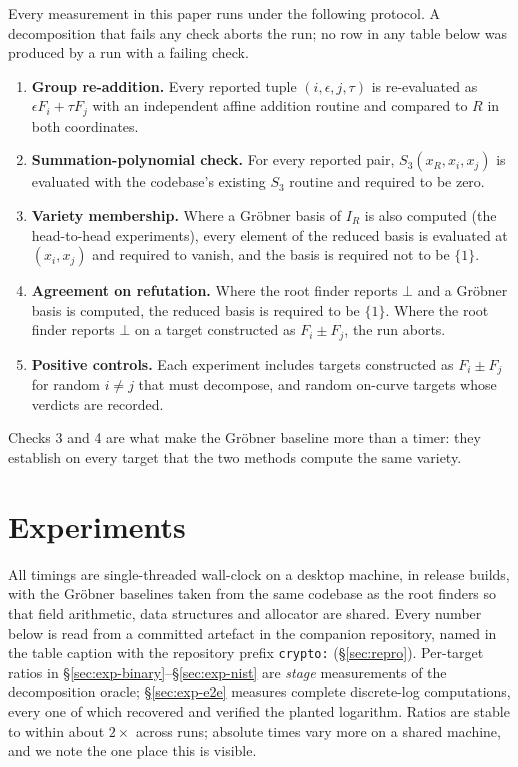 \documentclass[10pt,a4paper]{article}
\theoremstyle{remark}
\newcommand{\Sem}[1]{S_{#1}}
\newcommand{\code}[1]{\texttt{#1}}
\begin{document}
Every measurement in this paper runs under the following protocol. A
decomposition that fails any check aborts the run; no row in any table
below was produced by a run with a failing check.

\begin{enumerate}
\item \textbf{Group re-addition.} Every reported tuple
  $(i, \epsilon, j, \tau)$ is re-evaluated as $\epsilon F_i + \tau F_j$
  with an independent affine addition routine and compared to $R$ in
  both coordinates.
\item \textbf{Summation-polynomial check.} For every reported pair,
  $\Sem{3}(x_R, x_i, x_j)$ is evaluated with the codebase's existing
  $\Sem{3}$ routine and required to be zero.
\item \textbf{Variety membership.} Where a Gr\"obner basis of $I_R$ is
  also computed (the head-to-head experiments), every element of the
  reduced basis is evaluated at $(x_i, x_j)$ and required to vanish, and
  the basis is required not to be $\{1\}$.
\item \textbf{Agreement on refutation.} Where the root finder reports
  $\bot$ and a Gr\"obner basis is computed, the reduced basis is
  required to be $\{1\}$. Where the root finder reports $\bot$ on a
  target constructed as $F_i \pm F_j$, the run aborts.
\item \textbf{Positive controls.} Each experiment includes targets
  constructed as $F_i \pm F_j$ for random $i \neq j$ that must
  decompose, and random on-curve targets whose verdicts are recorded.
\end{enumerate}

Checks 3 and 4 are what make the Gr\"obner baseline more than a timer:
they establish on every target that the two methods compute the same
variety.

\section{Experiments}
\label{sec:experiments}

All timings are single-threaded wall-clock on a desktop machine, in
release builds, with the Gr\"obner baselines taken from the same
codebase as the root finders so that field arithmetic, data structures
and allocator are shared. Every number below is read from a committed
artefact in the companion repository, named in the table caption with
the repository prefix \code{crypto:} (\S\ref{sec:repro}). Per-target
ratios in \S\ref{sec:exp-binary}--\S\ref{sec:exp-nist} are \emph{stage}
measurements of the decomposition oracle; \S\ref{sec:exp-e2e} measures
complete discrete-log computations, every one of which recovered and
verified the planted logarithm. Ratios are stable
to within about $2\times$ across runs; absolute times vary more on a
shared machine, and we note the one place this is visible.
\end{document}
